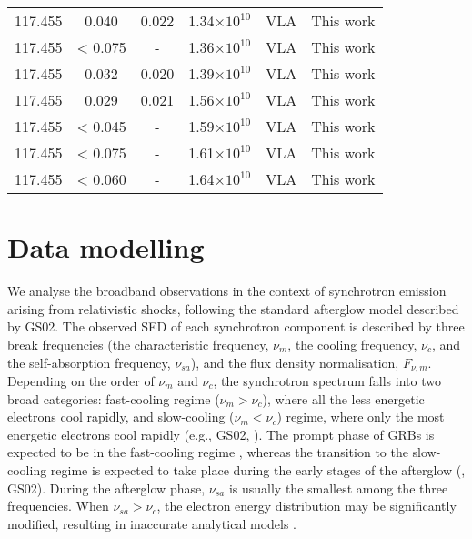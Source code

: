 \documentclass{aa}
\begin{document}
{\begin{longtable}{c|c|c|c|c|c}
117.455 &   0.040   &  0.022 &  1.34$\times 10^{10}$ &  VLA & This work \\
117.455 &   < 0.075 &  -     &  1.36$\times 10^{10}$ &  VLA & This work \\
117.455 &   0.032   &  0.020 &  1.39$\times 10^{10}$ &  VLA & This work \\
117.455 &   0.029   &  0.021 &  1.56$\times 10^{10}$ &  VLA & This work \\
117.455 &   < 0.045 &  -     &  1.59$\times 10^{10}$ &  VLA & This work \\
117.455 &   < 0.075 &  -     &  1.61$\times 10^{10}$ &  VLA & This work \\
117.455 &   < 0.060 &  -     &  1.64$\times 10^{10}$ &  VLA & This work \\
\end{longtable}
}%


\section{Data modelling}
\label{par:multi_sed}

We analyse the broadband observations in the context of synchrotron emission arising from relativistic shocks, following the standard afterglow model described by GS02.
The observed SED of each synchrotron component is described by three break frequencies (the characteristic frequency, $\nu_m$, the cooling frequency, $\nu_c$, and the self-absorption frequency, $\nu_{sa}$), and the flux density normalisation, $F_{\nu,m}$.
Depending on the order of $\nu_m$ and $\nu_c$, the synchrotron spectrum falls into two broad
categories: fast-cooling regime ($\nu_m > \nu_c$), where all the less energetic electrons cool rapidly, and slow-cooling ($\nu_m < \nu_c$) regime, where only the most energetic electrons cool rapidly (e.g., GS02, \citealt{Sari98,Gao13}).
The prompt phase of GRBs is expected to be in the fast-cooling regime \citep{Piran99}, whereas the transition to the slow-cooling regime is expected to take place during the early stages of the afterglow (\citealt{Meszaros97,Waxman97}, GS02).
During the afterglow phase, $\nu_{sa}$ is usually the smallest among the three frequencies.
When $\nu_{sa} > \nu_c$, the electron energy distribution may be significantly modified, resulting in inaccurate analytical models \citep{Gao13}.
\end{document}
